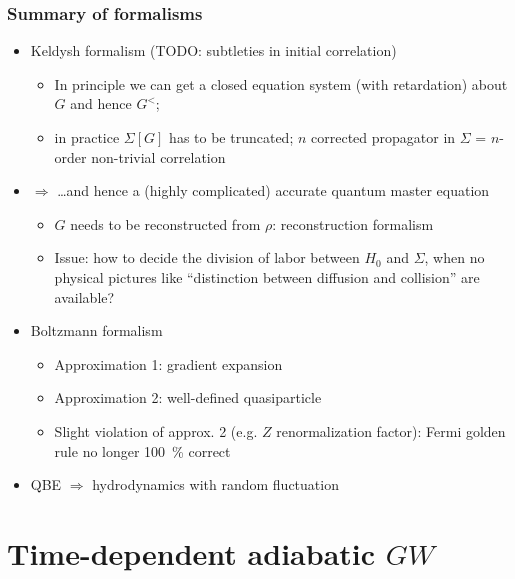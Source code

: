 \documentclass[t]{beamer}
\begin{document}
\begin{frame}
\frametitle{Summary of formalisms}

\begin{itemize}
    \item Keldysh formalism (TODO: subtleties in initial correlation)
    \begin{itemize}
        \item In principle we can get a closed equation system 
        (with retardation) about $G$ and hence $G^<$;
        \item in practice $\Sigma[G]$ has to be truncated;
        $n$ corrected propagator in $\Sigma$ = $n$-order non-trivial correlation
    \end{itemize}
    \item $\Rightarrow$ \dots and hence a (highly complicated) accurate 
    quantum master equation
    \begin{itemize}
        \item $G$ needs to be reconstructed from $\rho$: reconstruction formalism
        \item Issue: how to decide the division of labor between $H_0$ and $\Sigma$,
            when no physical pictures like ``distinction between diffusion and collision'' are available?
    \end{itemize}
    \item Boltzmann formalism
    \begin{itemize}
        \item Approximation 1: gradient expansion 
        \item Approximation 2: well-defined quasiparticle 
        \item Slight violation of approx. 2 (e.g. $Z$ renormalization factor): Fermi golden rule no longer \SI{100}{\percent} correct
    \end{itemize}
    \item QBE $\Rightarrow$ hydrodynamics with random fluctuation
\end{itemize}    

\end{frame}

\section{Time-dependent adiabatic $GW$}
\end{document}
